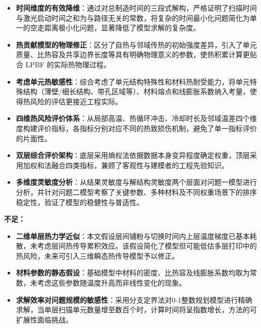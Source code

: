 \documentclass[a4paper, 12pt]{ctexart}
\begin{document}
\begin{itemize}
    \item \textbf{时间维度的有效降维}：通过对总制造时间的三段式解构，严格证明了扫描时间与激光启动时间之和为与路径无关的常数，将复杂的时间最小化问题简化为单一的空走距离极小化问题，显著降低了模型求解的复杂度。

    \item \textbf{热贡献模型的物理修正}：区分了自热与邻域传热的初始强度差异，引入了单元质量、比热容及共享边界长度等具有明确物理意义的参数，使热积累计算更贴合 LPBF 的实际热物理过程。

    \item \textbf{考虑单元热敏感性}：综合考虑了单元结构特殊性和材料热耐受能力，将单元特殊结构（薄壁/细长结构、带孔区域等）、材料熔点和线膨胀系数纳入考量，使得热风险的评估更接近工程实际。

    \item \textbf{四维热风险评价体系}：从局部高温、热循环冲击、冷却时长及邻域温差四个维度构建评价指标，各指标分别对应不同的热致损伤机制，避免了单一指标评价的片面性。

    \item \textbf{双层综合评价架构}：底层采用熵权法依据数据本身变异程度确定权重，顶层采用加权和法融合四类指标，兼顾了客观性与建模者的工程先验知识。

    \item \textbf{多维度灵敏度分析}：从结果灵敏度与解结构灵敏度两个层面对问题一模型进行分析，并针对问题二模型考察了关键参数、多种材料及不同权重场景下的排序稳定性，验证了模型的稳健性与普适性。

\end{itemize}

\vspace{0.5em}
\noindent\textbf{不足：}

\begin{itemize}
    \item \textbf{二维单层热力学近似}：本文假设层间铺粉与切换时间内上层温度梯度已基本耗散，未考虑层间热传导累积效应。该假设简化了模型但可能低估多层打印中的热风险，未来可引入三维瞬态热传导模型予以修正。

    \item \textbf{材料参数的静态假设}：基础模型中材料的密度、比热容及线膨胀系数均取为常数，未考虑这些参数随温度升高而非线性变化的现象。

    \item \textbf{求解效率对问题规模的敏感性}：采用分支定界法对0-1整数规划模型进行精确求解，当单层扫描单元数量增至数百个时，计算时间将呈指数增长，方法的可扩展性面临挑战。
\end{itemize}
\end{document}
